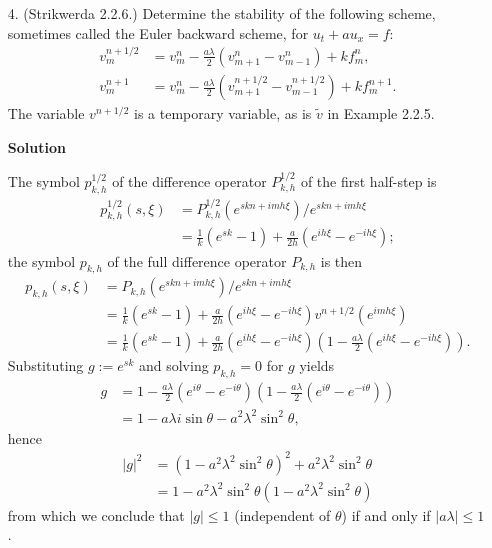 \documentclass{article}
\providecommand{\abs}[1]{\left\lvert#1\right\rvert}
\begin{document}
\begin{itemize}
\item[4.] (Strikwerda 2.2.6.) Determine the stability of the following scheme, sometimes called the Euler backward scheme, for $u_t + au_x = f$:
\begin{align*}
v^{n+1/2}_m & = v^n_m - \frac{a\lambda}{2} \left( v^n_{m+1} - v^n_{m-1} \right) + k f^n_m, \\
v^{n+1}_m & = v^n_m - \frac{a\lambda}{2} \left( v^{n+1/2}_{m+1} - v^{n+1/2}_{m-1} \right) + k f^{n+1}_m.
\end{align*}
The variable $v^{n+1/2}$ is a temporary variable, as is $\tilde{v}$ in Example 2.2.5.

\textbf{Solution}

The symbol $p^{1/2}_{k,h}$ of the difference operator $P^{1/2}_{k,h}$ of the first half-step is
\begin{align*}
p^{1/2}_{k,h}(s,\xi) & = P^{1/2}_{k,h} \left( e^{skn + imh\xi} \right) / e^{skn + imh\xi} \\
                      & = \frac{1}{k} \left( e^{sk} - 1 \right) + \frac{a}{2h} \left( e^{ih\xi} - e^{-ih\xi} \right);
\end{align*}
the symbol $p_{k,h}$ of the full difference operator $P_{k,h}$ is then
\begin{align*}
p_{k,h}(s,\xi) & = P_{k,h} \left( e^{skn + imh\xi} \right) / e^{skn + imh\xi} \\
               & = \frac{1}{k} \left( e^{sk} - 1 \right) + \frac{a}{2h} \left( e^{ih\xi} - e^{-ih\xi} \right) v^{n+1/2} \left( e^{imh\xi} \right) \\
               & = \frac{1}{k} \left( e^{sk} - 1 \right) + \frac{a}{2h}\left( e^{ih\xi} - e^{-ih\xi} \right) \left( 1 - \frac{a\lambda}{2} \left( e^{ih\xi} - e^{-ih\xi} \right) \right).
\end{align*}
Substituting $g := e^{sk}$ and solving $p_{k,h} = 0$ for $g$ yields
\begin{align*}
g & = 1 - \frac{a\lambda}{2} \left( e^{i\theta} - e^{-i\theta} \right) \left( 1 - \frac{a\lambda}{2} \left( e^{i\theta} - e^{-i\theta} \right) \right) \\
  & = 1 - a \lambda i \sin \theta - a^2 \lambda^2 \sin^2 \theta,
\end{align*}
hence
\begin{align*}
\abs{g}^2 & = \left( 1 - a^2 \lambda^2 \sin^2 \theta \right)^2 + a^2 \lambda^2 \sin^2 \theta \\
          & = 1 - a^2 \lambda^2 \sin^2 \theta \left( 1 - a^2 \lambda^2 \sin^2 \theta \right)
\end{align*}
from which we conclude that $\abs{g} \leq 1$ (independent of $\theta$) if and only if $\abs{a\lambda} \leq 1$.

\end{itemize}
\end{document}
